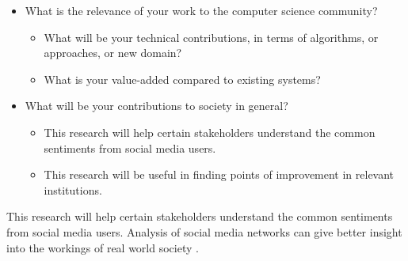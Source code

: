 %
%
\begin{itemize}
	\item  What is the relevance of your work to the computer science community? 
	
	\begin{itemize} 
		\item What will be your technical contributions, in terms of algorithms, or approaches, or new domain? 
		\item What is your value-added compared to existing systems? 
	\end{itemize}
	
	\item What will be your contributions to society in general? 
	\begin{itemize}
		\item This research will help certain stakeholders understand the common sentiments from social media users.
		\item This research will be useful in finding points of improvement in relevant institutions.
	\end{itemize}
\end{itemize}

This research will help certain stakeholders understand the common sentiments from social media users. Analysis of social media networks can give better insight into the workings of real world society \cite{Papadopoulos:2012}. 



